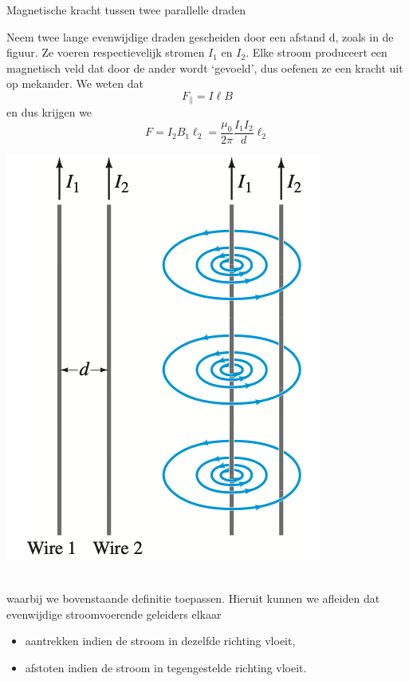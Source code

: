 \begin{app}{Magnetische kracht tussen twee parallelle draden}
    \begin{minipage}{0.77\textwidth}
        Neem twee lange evenwijdige draden gescheiden door een afstand d, zoals in de figuur. Ze voeren respectievelijk stromen $I_1$ en $I_2$.
        Elke stroom produceert een magnetisch veld dat door de ander wordt ‘gevoeld’, dus oefenen ze een kracht uit op mekander.
        We weten dat
        \begin{equation*}
            F_{\parallel} = I\ell B
        \end{equation*}
        en dus krijgen we
        \begin{equation*}
            F = I_{2}B_{1}\ell_{2} = \dfrac{\mu_0}{2\pi}\dfrac{I_{1}I_{2}}{d}\ell_{2}
        \end{equation*}
    \end{minipage}
    \begin{minipage}{.19\textwidth}
        \includegraphics[scale=0.225]{Images/Magnetisme/MagnetischeKrachtTussenTweeParallelleDraden}
    \end{minipage} \vspace{0.2cm}\\
    waarbij we bovenstaande definitie toepassen. Hieruit kunnen we afleiden dat evenwijdige stroomvoerende geleiders elkaar
    \begin{itemize}
        \item aantrekken indien de stroom in dezelfde richting vloeit,
        \item afstoten indien de stroom in tegengestelde richting vloeit.
    \end{itemize}
\end{app}

